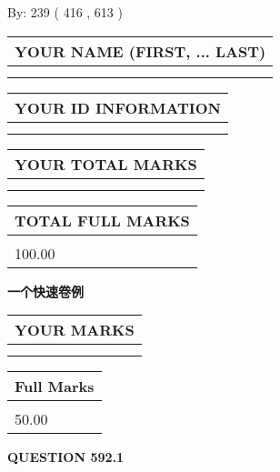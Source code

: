 \documentclass{ctexart}
\begin{document}
   
\hspace{1.0in} By: 
 239 ( 416 ,  613 )
   
   
   
   
\newpage 
\setcounter{page}{ 
   592001 } 
   
   
   
   
\noindent\begin{tabular}{|l|}
\hline
YOUR NAME (FIRST, ... LAST)  \\
\hline
 \\ 
 \\ 
\hline
\end{tabular}
\hspace{0.05in} \begin{tabular}{|l|}
\hline
 YOUR   ID   INFORMATION  \\
\hline
 \\ 
 \\ 
\hline
\end{tabular}
   
   
\vspace{0.2in}\noindent\begin{tabular}{|l|}
\hline
YOUR TOTAL MARKS  \\
\hline
 \\ 
 \\ 
\hline
\end{tabular}
\hspace{0.05in} \begin{tabular}{|l|}
\hline
TOTAL FULL MARKS  \\
\hline
 \\ 
100.00 \\
\hline
\end{tabular}
   
   
 \vspace{0.2in}
{\LARGE {\textbf{ 一个快速卷例}}}
   
   
  
\vspace{0.2in}
  
\noindent\begin{tabular}{|l|}
\hline
 YOUR MARKS  \\
\hline
 \\ 
 \\ 
\hline
\end{tabular}
\hspace{0.05in} \begin{tabular}{|l|}
\hline
 Full Marks  \\
\hline
 \\ 
50.00 \\
\hline
\end{tabular}
{\textbf{\Large{QUESTION
592.1 
}}}
  
\end{document}
